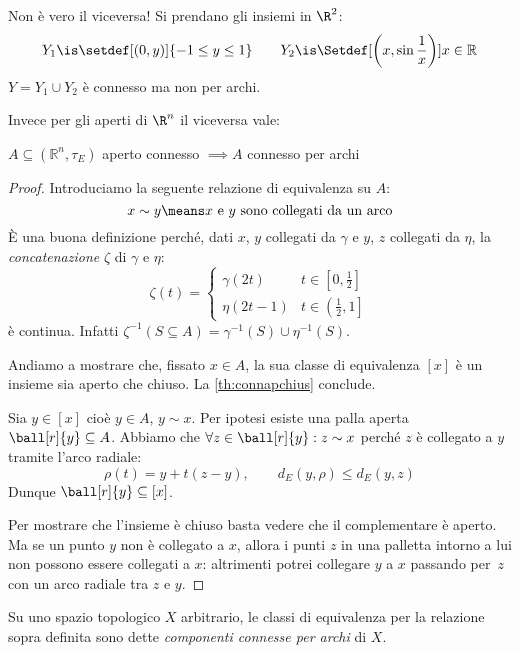 \begin{es}
 Non è vero il viceversa! Si prendano gli insiemi in $\R^2$:
 \[Y_1\is\setdef[(0,y)]{-1\le y \le 1}\qquad
 Y_2\is\Setdef[\left(x,\sin\frac{1}{x}\right)]{x\in \mathbb R}\]
 $Y=Y_1\cup Y_2$ è connesso ma non per archi. 
\end{es}

Invece per gli aperti di $\R^n$ il viceversa vale:

\begin{prop}
 $A\subseteq (\mathbb R^n, \tau _E)$ aperto connesso $\implies A$ connesso per archi
\end{prop}

\begin{proof}
 Introduciamo la seguente relazione di equivalenza su $A$:
 \[x\sim y \means \text{$x$ e $y$ sono collegati da un arco}\]
 È una buona definizione perché,
 dati $x$, $y$ collegati da $\gamma$ e $y$, $z$ collegati da $\eta$,
 la \emph{concatenazione} $\zeta$ di $\gamma$ e $\eta$:
 \[\zeta(t)=\begin{cases}
  \gamma(2t) & t\in\left[0,\frac12\right] \\
  \eta(2t-1) & t\in\left(\frac12,1\right]
 \end{cases}\]
 è continua.
 Infatti $\zeta^{-1}(S\subseteq A)=\gamma^{-1}(S)\cup\eta^{-1}(S)$.
 
 Andiamo a mostrare che, fissato $x\in A$,
 la sua classe di equivalenza $[x]$ è un insieme sia aperto che chiuso.
 La \autoref{th:connapchius} conclude.
 
 Sia $y\in[x]$ cioè $y\in A$, $y\sim x$.
 Per ipotesi esiste una palla aperta $\ball[r]{y}\subseteq A$.
 Abbiamo che $\forall z\in \ball[r]{y}:z\sim x$
 perché $z$ è collegato a $y$ tramite l'arco radiale:
 \[\rho(t)=y+t(z-y),\qquad d_E(y,\rho)\le d_E(y,z)\]
 Dunque $\ball[r]{y}\subseteq [x]$.
 
 Per mostrare che l'insieme è chiuso basta vedere che il complementare è aperto.
 Ma se un punto $y$ non è collegato a $x$,
 allora i punti $z$ in una palletta intorno a lui non possono essere collegati a $x$:
 altrimenti potrei collegare $y$ a $x$ passando per~$z$ con un arco radiale tra $z$ e $y$.
\end{proof}

\begin{defn}
 Su uno spazio topologico $X$ arbitrario, le classi di equivalenza per la relazione sopra definita sono dette \emph{componenti connesse per archi} di $X$.
\end{defn}

